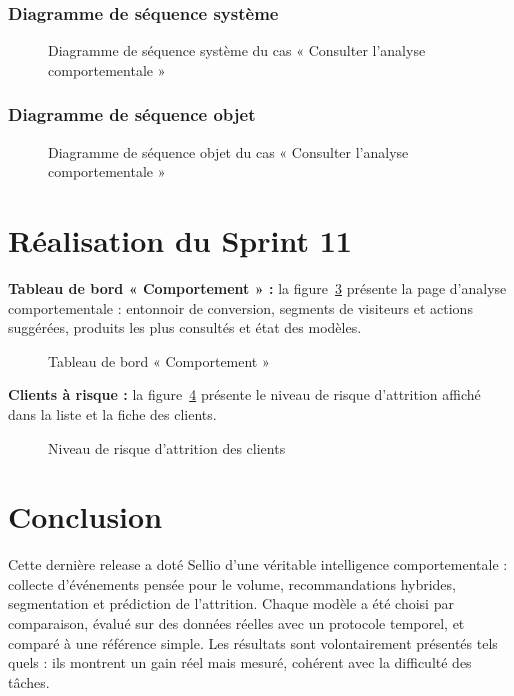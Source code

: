 \subsubsection{Diagramme de séquence système}
\begin{figure}[H]
    \centering
    \caption{Diagramme de séquence système du cas « Consulter l'analyse comportementale »}
    \label{fig:dss-comportement}
\end{figure}

\subsubsection{Diagramme de séquence objet}
\begin{figure}[H]
    \centering
    \caption{Diagramme de séquence objet du cas « Consulter l'analyse comportementale »}
    \label{fig:dso-comportement}
\end{figure}

\section{Réalisation du Sprint 11}
\textbf{Tableau de bord « Comportement » :} la figure~\ref{fig:ui-comportement} présente la page d'analyse comportementale : entonnoir de conversion, segments de visiteurs et actions suggérées, produits les plus consultés et état des modèles.
\begin{figure}[H]
    \centering
    \caption{Tableau de bord « Comportement »}
    \label{fig:ui-comportement}
\end{figure}

\textbf{Clients à risque :} la figure~\ref{fig:ui-churn} présente le niveau de risque d'attrition affiché dans la liste et la fiche des clients.
\begin{figure}[H]
    \centering
    \caption{Niveau de risque d'attrition des clients}
    \label{fig:ui-churn}
\end{figure}

\section*{Conclusion}
Cette dernière release a doté Sellio d'une véritable intelligence comportementale : collecte d'événements pensée pour le volume, recommandations hybrides, segmentation et prédiction de l'attrition. Chaque modèle a été choisi par comparaison, évalué sur des données réelles avec un protocole temporel, et comparé à une référence simple. Les résultats sont volontairement présentés tels quels : ils montrent un gain réel mais mesuré, cohérent avec la difficulté des tâches.
